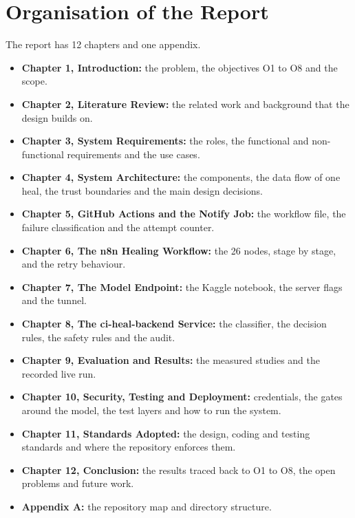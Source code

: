 \section{Organisation of the Report}

The report has 12 chapters and one appendix.

\begin{itemize}
  \item \textbf{Chapter 1, Introduction:} the problem, the objectives O1 to O8 and the scope.
  \item \textbf{Chapter 2, Literature Review:} the related work and background that the design builds on.
  \item \textbf{Chapter 3, System Requirements:} the roles, the functional and non-functional requirements and the use cases.
  \item \textbf{Chapter 4, System Architecture:} the components, the data flow of one heal, the trust boundaries and the main design decisions.
  \item \textbf{Chapter 5, GitHub Actions and the Notify Job:} the workflow file, the failure classification and the attempt counter.
  \item \textbf{Chapter 6, The n8n Healing Workflow:} the 26 nodes, stage by stage, and the retry behaviour.
  \item \textbf{Chapter 7, The Model Endpoint:} the Kaggle notebook, the server flags and the tunnel.
  \item \textbf{Chapter 8, The ci-heal-backend Service:} the classifier, the decision rules, the safety rules and the audit.
  \item \textbf{Chapter 9, Evaluation and Results:} the measured studies and the recorded live run.
  \item \textbf{Chapter 10, Security, Testing and Deployment:} credentials, the gates around the model, the test layers and how to run the system.
  \item \textbf{Chapter 11, Standards Adopted:} the design, coding and testing standards and where the repository enforces them.
  \item \textbf{Chapter 12, Conclusion:} the results traced back to O1 to O8, the open problems and future work.
  \item \textbf{Appendix A:} the repository map and directory structure.
\end{itemize}
